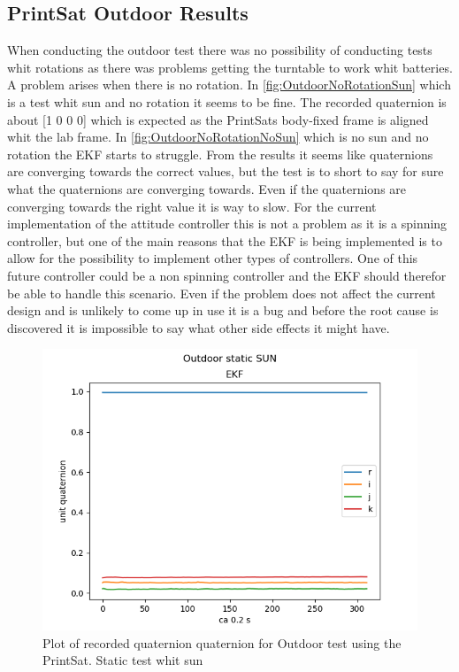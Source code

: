 \subsection{PrintSat Outdoor Results}
When conducting the outdoor test there was no possibility of conducting tests whit rotations as there was problems getting the turntable to work whit batteries. A problem arises when there is no rotation. In \autoref{fig:OutdoorNoRotationSun} which is a test whit sun and no rotation it seems to be fine. The recorded quaternion is about [1 0 0 0] which is expected as the PrintSats body-fixed frame is aligned whit the lab frame. In \autoref{fig:OutdoorNoRotationNoSun} which is no sun and no rotation the EKF starts to struggle. From the results it seems like quaternions are converging towards the correct values, but the test is to short to say for sure what the quaternions are converging towards. Even if the quaternions are converging towards the right value it is way to slow. For the current implementation of the attitude controller this is not a  problem as it is a spinning controller, but one of the main reasons that the EKF is being implemented is to allow for the possibility to implement other types of controllers. One of this future controller could be a non spinning controller and the EKF should therefor be able to handle this scenario. Even if the problem does not affect the current design and is unlikely to come up in use it is a bug and before the root cause is discovered it is impossible to say what other side effects it might have.

\begin{figure}[tbp]
	\centering
	\includegraphics[width=0.6\columnwidth]{./Pictures/run3OutdoorStaticSUN}
	\caption{Plot of recorded quaternion quaternion for Outdoor test using the PrintSat. Static test whit sun}
	\label{fig:OutdoorNoRotationSun}
\end{figure}

